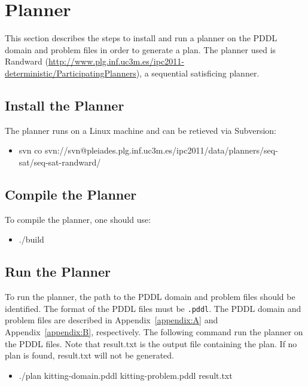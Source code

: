 \section{Planner}
This section describes the steps to install and run a planner on the PDDL domain and problem files in order to generate a plan. The planner used is Randward (\url{http://www.plg.inf.uc3m.es/ipc2011-deterministic/ParticipatingPlanners}), a sequential satisficing planner.

\subsection{Install the Planner}
The planner runs on a Linux machine and can be retieved via Subversion:
\begin{itemize}
\item svn co svn://svn@pleiades.plg.inf.uc3m.es/ipc2011/data/planners/seq-sat/seq-sat-randward/
\end{itemize}

\subsection{Compile the Planner}
To compile the planner, one should use:
\begin{itemize}
\item ./build
\end{itemize}

\subsection{Run the Planner}
To run the planner, the path to the PDDL domain and problem files should be identified. The format of the PDDL files must be \texttt{.pddl}. The PDDL domain and problem files are described in Appendix~\ref{appendix:A} and Appendix~\ref{appendix:B}, respectively. The following command run the planner on the PDDL files. Note that result.txt is the output file containing the plan. If no plan is found, result.txt will not be generated.
\begin{itemize}
\item ./plan kitting-domain.pddl kitting-problem.pddl result.txt
\end{itemize}
